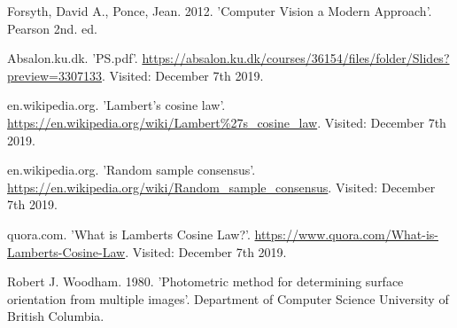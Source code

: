 \begin{thebibliography}{9}
Forsyth, David A., Ponce, Jean. 2012. 'Computer Vision a Modern Approach'. Pearson 2nd. ed.

Absalon.ku.dk. 'PS.pdf'. \url{https://absalon.ku.dk/courses/36154/files/folder/Slides?preview=3307133}. Visited: December 7th 2019.

en.wikipedia.org. 'Lambert's cosine law'. \url{https://en.wikipedia.org/wiki/Lambert\%27s_cosine_law}. Visited: December 7th 2019.

en.wikipedia.org. 'Random sample consensus'. \url{https://en.wikipedia.org/wiki/Random_sample_consensus}. Visited: December 7th 2019.

quora.com. 'What is Lamberts Cosine Law?'. \url{https://www.quora.com/What-is-Lamberts-Cosine-Law}. Visited: December 7th 2019.

Robert J. Woodham. 1980. 'Photometric method for determining surface orientation from multiple images'. Department of Computer Science University of British Columbia.

\end{thebibliography}